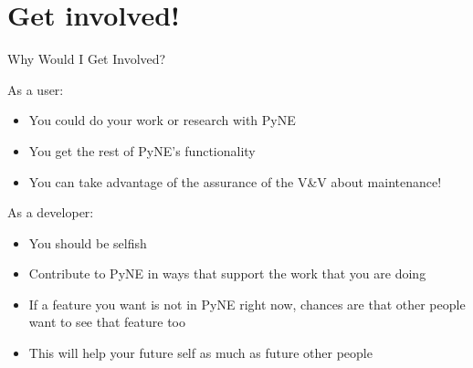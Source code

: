 \documentclass[xcolor=x11names,compress]{beamer}
\renewcommand{\(}{\begin{columns}}
\renewcommand{\)}{\end{columns}}
\newcommand{\<}[1]{\begin{column}{#1}}
\renewcommand{\>}{\end{column}}
\begin{document}
\section{Get involved!}
\begin{frame}{Why Would I Get Involved?}

    \begin{block}{As a \alert{user}:}
    \begin{itemize}
      \item You could do your work or research with PyNE
      \item You get the rest of PyNE's functionality
      \item You can take advantage of the assurance of the V\&V 
      about maintenance!
    \end{itemize}
    \end{block}

    \vspace*{1 em}
    \begin{block}{As a \alert{developer}:}
    \begin{itemize}
      \item You should be selfish
      \item Contribute to PyNE in ways that support the work that you are doing
      \item If a feature you want is not in PyNE right now, chances are that other
      people want to see that feature too
      \item This will help your future self as much as future other people
    \end{itemize}
\end{block}

\end{frame}
\end{document}

